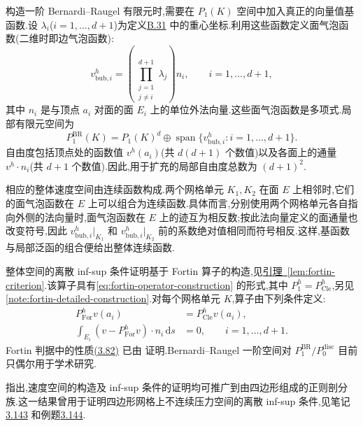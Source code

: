 \begin{note}\label{note:bernardi-raugel-first-order}
构造一阶 Bernardi--Raugel 有限元时,需要在 $P_1(K)$ 空间中加入真正的向量值基函数.设 $\lambda_i$($i=1,\ldots,d+1$)为定义\hyperref[def:appendix-b-31]{B.31} 中的重心坐标.利用这些函数定义面气泡函数(二维时即边气泡函数):
\[
  v_{\mathrm{bub},i}^h
  =\left(\prod_{\substack{j=1\\j\ne i}}^{d+1}\lambda_j\right)n_i,
  \qquad i=1,\ldots,d+1,
\]
其中 $n_i$ 是与顶点 $a_i$ 对面的面 $E_i$ 上的单位外法向量.这些面气泡函数是多项式.局部有限元空间为
\[
  P_1^{\mathrm{BR}}(K)
  =P_1(K)^d\oplus\operatorname{span}\{v_{\mathrm{bub},i}^h:
      i=1,\ldots,d+1\}.
\]
自由度包括顶点处的函数值 $v^h(a_i)$(共 $d(d+1)$ 个数值)以及各面上的通量 $v^h\cdot n_i$(共 $d+1$ 个数值).因此,用于扩充的局部自由度总数为 $(d+1)^2$.

相应的整体速度空间由连续函数构成.两个网格单元 $K_1,K_2$ 在面 $E$ 上相邻时,它们的面气泡函数在 $E$ 上可以组合为连续函数.具体而言,分别使用两个网格单元各自指向外侧的法向量时,面气泡函数在 $E$ 上的迹互为相反数;按此法向量定义的面通量也改变符号,因此 $v_{\mathrm{bub},i}^h|_{K_1}$ 和 $v_{\mathrm{bub},i}^h|_{K_2}$ 前的系数绝对值相同而符号相反.这样,基函数与局部泛函的组合便给出整体连续函数.

整体空间的离散 inf-sup 条件证明基于 Fortin 算子的构造,见\hyperref[lem:fortin-criterion]{引理~\ref{lem:fortin-criterion}}.该算子具有\cref{eq:fortin-operator-construction} 的形式,其中 $P_1^h=P_{\mathrm{Cle}}^h$,另见\cref{note:fortin-detailed-construction}.对每个网格单元 $K$,算子由下列条件定义:
\[
\begin{aligned}
  P_{\mathrm{For}}^h v(a_i)&=P_{\mathrm{Cle}}^h v(a_i),\\
  \int_{E_i}(v-P_{\mathrm{For}}^h v)\cdot n_i\,\mathrm{d}s&=0,
  \qquad i=1,\ldots,d+1.
\end{aligned}
\]
Fortin 判据中的性质\hyperref[eq:fortin-property]{(3.82)} 已由\textcite[引理 II.4]{BernardiRaugel1985} 证明.Bernardi--Raugel 一阶空间对 $P_1^{\mathrm{BR}}/P_0^{\mathrm{disc}}$ 目前只偶尔用于学术研究.
\end{note}

\begin{note}[四边形网格单元构成的剖分族]\label{note:bernardi-raugel-quadrilaterals}
\textcite{BernardiRaugel1985} 指出,速度空间的构造及 inf-sup 条件的证明均可推广到由四边形组成的正则剖分族.这一结果曾用于证明四边形网格上不连续压力空间的离散 inf-sup 条件,见笔记\hyperref[note:unmapped-qk-pdisc-2d]{3.143} 和例题\hyperref[ex:unmapped-q2-p1]{3.144}.
\end{note}

